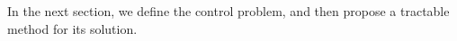 





In the next section, we define the control problem, and then propose a tractable method for its solution.  


